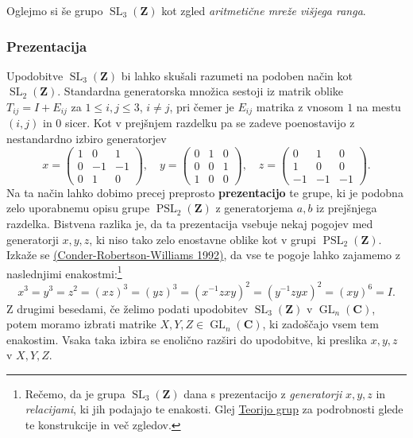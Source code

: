 \documentclass[11pt]{book}
\def\ZZ{\mathbf{Z}}
\def\CC{\mathbf{C}}
\DeclareMathOperator\GL{GL}
\DeclareMathOperator\SL{SL}
\DeclareMathOperator\PSL{PSL}
\def\definicija{\color{rdeca}\bf}
\theoremstyle{definition}
\theoremstyle{zgled}
\theoremstyle{zgledbrezstevilke}
\theoremstyle{odprtproblem}
\theoremstyle{domacanaloga}
\theoremstyle{izrek}
\begin{document}
Oglejmo si še grupo $\SL_3(\ZZ)$ kot zgled \emph{aritmetične mreže višjega ranga}. 

\subsubsection{Prezentacija}

Upodobitve $\SL_3(\ZZ)$ bi lahko skušali razumeti na podoben način kot $\SL_2(\ZZ)$. Standardna generatorska množica sestoji iz matrik oblike $T_{ij} = I + E_{ij}$ za $1 \leq i, j \leq 3$, $i \neq j$, pri čemer je $E_{ij}$ matrika z vnosom $1$ na mestu $(i,j)$ in $0$ sicer. Kot v prejšnjem razdelku pa se zadeve poenostavijo z nestandardno izbiro generatorjev
\[
    x =
    \begin{pmatrix}
        1 &  0 &  1 \\
        0 & -1 & -1 \\
        0 &  1 &  0
    \end{pmatrix}, \quad
    y =
    \begin{pmatrix}
        0 &  1 &  0 \\
        0 &  0 &  1 \\
        1 &  0 &  0
    \end{pmatrix}, \quad
    z =
    \begin{pmatrix}
        0 &  1 &  0 \\
        1 &  0 &  0 \\
       -1 & -1 & -1
    \end{pmatrix}.  
\]
Na ta način lahko dobimo precej preprosto {\definicija prezentacijo} te grupe, ki je podobna zelo uporabnemu opisu grupe $\PSL_2(\ZZ)$ z generatorjema $a,b$ iz prejšnjega razdelka. Bistvena razlika je, da ta prezentacija vsebuje nekaj pogojev med generatorji $x,y,z$, ki niso tako zelo enostavne oblike kot v grupi $\PSL_2(\ZZ)$. Izkaže se \href{https://www.ams.org/proc/1992-115-01/S0002-9939-1992-1079696-5/}{(Conder-Robertson-Williams 1992)}, da vse te pogoje lahko zajamemo z naslednjimi enakostmi:\footnote{Rečemo, da je grupa $\SL_3(\ZZ)$ dana s prezentacijo z \emph{generatorji} $x,y,z$ in \emph{relacijami}, ki jih podajajo te enakosti. Glej \href{https://urbanjezernik.github.io/teorija-grup}{Teorijo grup} za podrobnosti glede te konstrukcije in več zgledov.}
\[
    x^3 = y^3 = z^2 = (xz)^3 = (yz)^3 = (x^{-1}zxy)^2 = (y^{-1}zyx)^2 = (xy)^6 = I.
\]
Z drugimi besedami, če želimo podati upodobitev $\SL_3(\ZZ)$ v $\GL_n(\CC)$, potem moramo izbrati matrike $X,Y,Z \in \GL_n(\CC)$, ki zadoščajo vsem tem enakostim. Vsaka taka izbira se enolično razširi do upodobitve, ki preslika $x,y,z$ v $X,Y,Z$.
\end{document}
